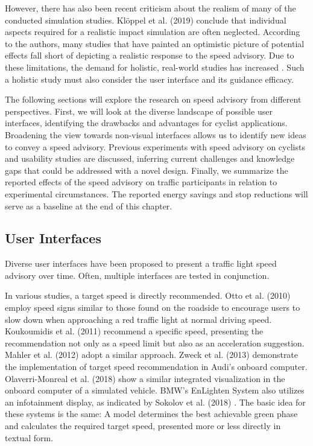 However, there has also been recent criticism about the realism of many of the conducted simulation studies. Klöppel et al. (2019) \cite{kloeppel_performance_2019} conclude that individual aspects required for a realistic impact simulation are often neglected. According to the authors, many studies that have painted an optimistic picture of potential effects fall short of depicting a realistic response to the speed advisory. Due to these limitations, the demand for holistic, real-world studies has increased \cite{stahlmann_exploring_2018}. Such a holistic study must also consider the user interface and its guidance efficacy. 

The following sections will explore the research on speed advisory from different perspectives. First, we will look at the diverse landscape of possible user interfaces, identifying the drawbacks and advantages for cyclist applications. Broadening the view towards non-visual interfaces allows us to identify new ideas to convey a speed advisory. Previous experiments with speed advisory on cyclists and usability studies are discussed, inferring current challenges and knowledge gaps that could be addressed with a novel design. Finally, we summarize the reported effects of the speed advisory on traffic participants in relation to experimental circumstances. The reported energy savings and stop reductions will serve as a baseline at the end of this chapter.

\subsection{User Interfaces}

Diverse user interfaces have been proposed to present a traffic light speed advisory over time. Often, multiple interfaces are tested in conjunction.

In various studies, a target speed is directly recommended. Otto et al. (2010) \cite{otto_operating_2010} employ speed signs similar to those found on the roadside to encourage users to slow down when approaching a red traffic light at normal driving speed. Koukoumidis et al. (2011) \cite{koukoumidis_signalguru_2011, koukoumidis_leveraging_2012} recommend a specific speed, presenting the recommendation not only as a speed limit but also as an acceleration suggestion. Mahler et al. (2012) \cite{mahler_reducing_2012} adopt a similar approach. Zweck et al. (2013) \cite{zweck_traffic_2013} demonstrate the implementation of target speed recommendation in Audi's onboard computer. Olaverri-Monreal et al. (2018) \cite{olaverri-monreal_implementation_2018} show a similar integrated visualization in the onboard computer of a simulated vehicle. BMW's EnLighten System also utilizes an infotainment display, as indicated by Sokolov et al. (2018) \cite{sokolov_effects_2018}. The basic idea for these systems is the same: A model determines the best achievable green phase and calculates the required target speed, presented more or less directly in textual form.

